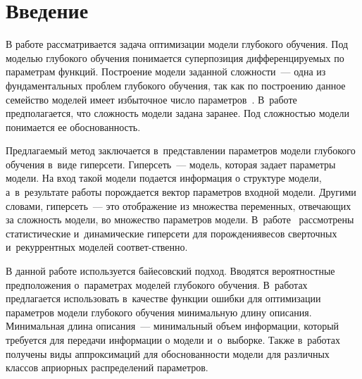 

\vspace*{-2pt}



\thispagestyle{headings}

\begin{multicols}{2}

\label{st\stat}


\section{Введение}

В работе рассматривается задача оптимизации модели глубокого обучения. Под 
моделью глубокого обучения понимается суперпозиция дифференцируемых по 
параметрам функций. Построение модели заданной сложности~--- одна из 
фундаментальных проблем глубокого обучения, так как по построению данное 
семейство моделей имеет избыточное число параметров~\cite{conf/nips/Graves11}. 
В~работе предполагается, что сложность модели задана заранее. Под сложностью 
модели понимается ее обоснованность.

Предлагаемый метод заключается в~представлении параметров модели глубокого 
обучения в~виде гиперсети. Гиперсеть~--- модель, которая задает параметры 
модели. На вход такой модели подается информация о структуре модели, 
а~в~результате работы порождается вектор параметров входной модели. Другими словами, 
гиперсеть~--- это отоб\-ра\-же\-ние из множества переменных, от\-ве\-ча\-ющих за слож\-ность 
модели, во множество па\-ра\-мет\-ров модели. В~работе~\cite{journals/corr/HaDL16} 
рассмотрены  статистические и~динамические гиперсети для порождения\linebreak весов 
сверточных и~рекуррентных моделей со\-от\-вет-\linebreak ственно.

В данной работе используется байесовский подход. Вводятся вероятностные 
предположения о~па\-ра\-мет\-рах моделей глубокого обучения.
В~работах~\cite{conf/nips/Graves11, Kuzn} предлагается использовать в~качестве 
функции ошибки для оптимизации параметров модели глубокого обучения минимальную 
длину описания. Минимальная длина описания~--- минимальный объем информации, 
который требуется для передачи информации о модели и~о~выборке. Также 
в~работах~\cite{conf/nips/Graves11, BakStr18} получены виды аппроксимаций для 
обоснованности модели для различных классов априорных распределений параметров.


\end{multicols}
